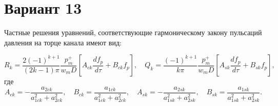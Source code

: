 \documentclass{article}
\begin{document}
\section*{Вариант 13}

Частные решения уравнений, соответствующие гармоническому закону
пульсаций давления на торце канала имеют вид:

\begin{equation}
    R_k = \frac{2(-1)^{k+1}}{(2k-1)\pi}
          \frac{p_m^+}{w_m D}
          \left[A_{ck}\frac{df_p}{d\tau} + B_{ck}f_p\right],
    \quad
    Q_k = \frac{(-1)^{k+1}}{k\pi}
          \frac{p_m^+}{w_m D}
          \left[A_{sk}\frac{df_p}{d\tau} + B_{sk}f_p\right],
\end{equation}
где
\[
    A_{ck} = -\frac{a_{2ck}}{a_{1ck}^2 + a_{2ck}^2},
    \quad
    B_{ck} = \frac{a_{1ck}}{a_{1ck}^2 + a_{2ck}^2},
    \quad
    A_{sk} = -\frac{a_{2sk}}{a_{1sk}^2 + a_{2sk}^2},
    \quad
    B_{sk} = \frac{a_{1sk}}{a_{1sk}^2 + a_{2sk}^2}.
\]
\end{document}
